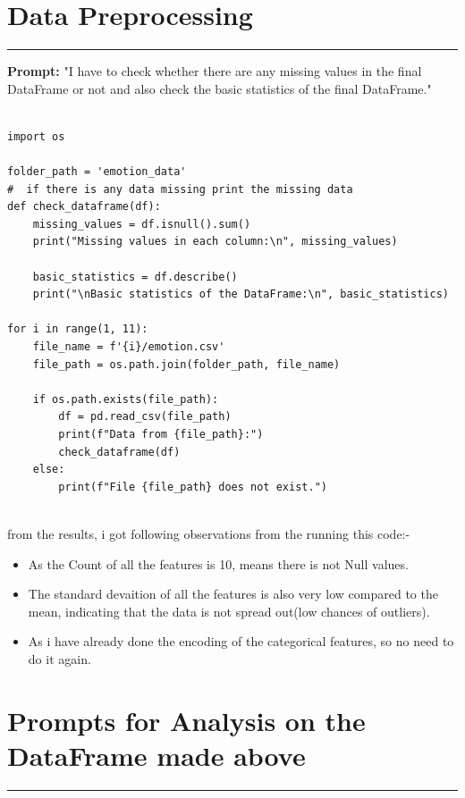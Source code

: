 \documentclass[11pt,a4paper]{article}
\begin{document}
\section{Data Preprocessing}
\begin{center}
    \color{red}\rule{1\linewidth}{2mm}
\end{center}
\label{sec:preprocessing}

\textbf{Prompt:} "I have to check whether there are any missing values in the final DataFrame or not and also check the basic statistics of the final DataFrame."

\begin{tcolorbox}
    \begin{verbatim}

import os

folder_path = 'emotion_data'
#  if there is any data missing print the missing data
def check_dataframe(df):
    missing_values = df.isnull().sum()
    print("Missing values in each column:\n", missing_values)
    
    basic_statistics = df.describe()
    print("\nBasic statistics of the DataFrame:\n", basic_statistics)

for i in range(1, 11):
    file_name = f'{i}/emotion.csv'
    file_path = os.path.join(folder_path, file_name)
    
    if os.path.exists(file_path):
        df = pd.read_csv(file_path)
        print(f"Data from {file_path}:")
        check_dataframe(df)
    else:
        print(f"File {file_path} does not exist.")
    
    \end{verbatim}
\end{tcolorbox}

 from the results, i got following observations from the running this code:-
\begin{itemize}
    \item As the Count of all the features is 10, means there is not Null values.
    \item The standard devaition of all the features is also very low compared
    to the mean, indicating that the data is not spread out(low chances of
    outliers).
    \item As i have already done the encoding of the categorical features, so no
    need to do it again.
\end{itemize}


\section{Prompts for Analysis on the DataFrame made above}
\begin{center}
    \color{red}\rule{1\linewidth}{2mm}
\end{center}
\end{document}
